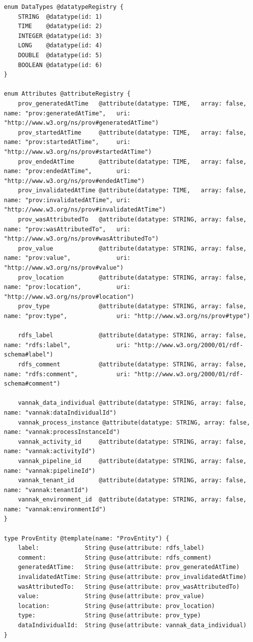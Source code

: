 \begin{lstlisting}
enum DataTypes @datatypeRegistry {
    STRING  @datatype(id: 1)
    TIME    @datatype(id: 2)
    INTEGER @datatype(id: 3)
    LONG    @datatype(id: 4)
    DOUBLE  @datatype(id: 5)
    BOOLEAN @datatype(id: 6)
}

enum Attributes @attributeRegistry {
    prov_generatedAtTime   @attribute(datatype: TIME,   array: false, name: "prov:generatedAtTime",   uri: "http://www.w3.org/ns/prov#generatedAtTime")
    prov_startedAtTime     @attribute(datatype: TIME,   array: false, name: "prov:startedAtTime",     uri: "http://www.w3.org/ns/prov#startedAtTime")
    prov_endedAtTime       @attribute(datatype: TIME,   array: false, name: "prov:endedAtTime",       uri: "http://www.w3.org/ns/prov#endedAtTime")
    prov_invalidatedAtTime @attribute(datatype: TIME,   array: false, name: "prov:invalidatedAtTime", uri: "http://www.w3.org/ns/prov#invalidatedAtTime")
    prov_wasAttributedTo   @attribute(datatype: STRING, array: false, name: "prov:wasAttributedTo",   uri: "http://www.w3.org/ns/prov#wasAttributedTo")
    prov_value             @attribute(datatype: STRING, array: false, name: "prov:value",             uri: "http://www.w3.org/ns/prov#value")
    prov_location          @attribute(datatype: STRING, array: false, name: "prov:location",          uri: "http://www.w3.org/ns/prov#location")
    prov_type              @attribute(datatype: STRING, array: false, name: "prov:type",              uri: "http://www.w3.org/ns/prov#type")

    rdfs_label             @attribute(datatype: STRING, array: false, name: "rdfs:label",             uri: "http://www.w3.org/2000/01/rdf-schema#label")
    rdfs_comment           @attribute(datatype: STRING, array: false, name: "rdfs:comment",           uri: "http://www.w3.org/2000/01/rdf-schema#comment")

    vannak_data_individual @attribute(datatype: STRING, array: false, name: "vannak:dataIndividualId")
    vannak_process_instance @attribute(datatype: STRING, array: false, name: "vannak:processInstanceId")
    vannak_activity_id     @attribute(datatype: STRING, array: false, name: "vannak:activityId")
    vannak_pipeline_id     @attribute(datatype: STRING, array: false, name: "vannak:pipelineId")
    vannak_tenant_id       @attribute(datatype: STRING, array: false, name: "vannak:tenantId")
    vannak_environment_id  @attribute(datatype: STRING, array: false, name: "vannak:environmentId")
}

type ProvEntity @template(name: "ProvEntity") {
    label:             String @use(attribute: rdfs_label)
    comment:           String @use(attribute: rdfs_comment)
    generatedAtTime:   String @use(attribute: prov_generatedAtTime)
    invalidatedAtTime: String @use(attribute: prov_invalidatedAtTime)
    wasAttributedTo:   String @use(attribute: prov_wasAttributedTo)
    value:             String @use(attribute: prov_value)
    location:          String @use(attribute: prov_location)
    type:              String @use(attribute: prov_type)
    dataIndividualId:  String @use(attribute: vannak_data_individual)
}
\end{lstlisting}

